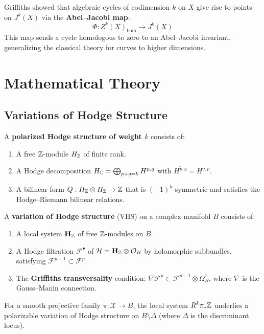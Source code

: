 Griffiths showed that algebraic cycles of codimension $k$ on $X$ give rise to points on $J^k(X)$ via the \textbf{Abel--Jacobi map}:
\[
\Phi: Z^k(X)_{\hom} \to J^k(X)
\]
This map sends a cycle homologous to zero to an Abel--Jacobi invariant, generalizing the classical theory for curves to higher dimensions.

\section{Mathematical Theory}

\subsection{Variations of Hodge Structure}

\begin{definition}
A \textbf{polarized Hodge structure of weight $k$} consists of:
\begin{enumerate}
    \item A free $\mathbb{Z}$-module $H_{\mathbb{Z}}$ of finite rank.
    \item A Hodge decomposition $H_{\mathbb{C}} = \bigoplus_{p+q=k} H^{p,q}$ with $\overline{H^{p,q}} = H^{q,p}$.
    \item A bilinear form $Q: H_{\mathbb{Z}} \otimes H_{\mathbb{Z}} \to \mathbb{Z}$ that is $(-1)^k$-symmetric and satisfies the Hodge--Riemann bilinear relations.
\end{enumerate}
\end{definition}

\begin{definition}
A \textbf{variation of Hodge structure} (VHS) on a complex manifold $B$ consists of:
\begin{enumerate}
    \item A local system $\mathbf{H}_{\mathbb{Z}}$ of free $\mathbb{Z}$-modules on $B$.
    \item A Hodge filtration $\mathcal{F}^\bullet$ of $\mathcal{H} = \mathbf{H}_{\mathbb{Z}} \otimes \mathcal{O}_B$ by holomorphic subbundles, satisfying $\mathcal{F}^{p+1} \subset \mathcal{F}^p$.
    \item The \textbf{Griffiths transversality} condition: $\nabla \mathcal{F}^p \subset \mathcal{F}^{p-1} \otimes \Omega_B^1$, where $\nabla$ is the Gauss--Manin connection.
\end{enumerate}
\end{definition}

\begin{theorem}[Griffiths, 1968]
For a smooth projective family $\pi: \mathcal{X} \to B$, the local system $R^k\pi_*\mathbb{Z}$ underlies a polarizable variation of Hodge structure on $B \setminus \Delta$ (where $\Delta$ is the discriminant locus).
\end{theorem}

